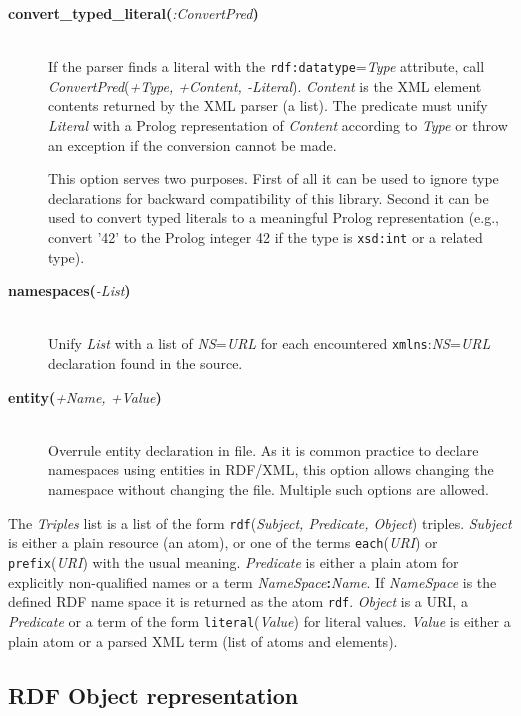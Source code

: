 \begin{description}
\begin{description}
  \item[{\bf convert\_typed\_literal}{\bf (}{\it :ConvertPred}{\bf)}]\mbox{}\\
If the parser finds a literal with the {\tt rdf:datatype}={\it Type}
attribute, call \emph{ConvertPred}({\it +Type, +Content, -Literal}).
{\it Content} is the XML element contents returned by the XML
parser (a list). The predicate must unify {\it Literal}
with a Prolog representation of {\it Content} according to
{\it Type} or throw an exception if the conversion cannot be made.

This option serves two purposes.  First of all it can be used
to ignore type declarations for backward compatibility of this
library.  Second it can be used to convert typed literals to 
a meaningful Prolog representation (e.g., convert '42' to the
Prolog integer 42 if the type is {\tt xsd:int} or a related
type).

  \item[{\bf namespaces}{\bf (}{\it -List}{\bf)}]\mbox{}\\
Unify {\it List} with a list of {\it NS}={\it URL} for each
encountered {\tt xmlns}:{\it NS}={\it URL} declaration found
in the source.

  \item[{\bf entity}{\bf (}{\it +Name, +Value}{\bf)}]\mbox{}\\
Overrule entity declaration in file.  As it is common practice
to declare namespaces using entities in RDF/XML, this option
allows changing the namespace without changing the file.
Multiple such options are allowed.
   \end{description}

The {\it Triples} list is a list of the form \texttt{rdf}({\it Subject, Predicate,
Object}) triples.  {\it Subject} is either a plain resource (an atom),
or one of the terms \texttt{each}({\it URI}) or \texttt{prefix}({\it URI}) with the
usual meaning.  {\it Predicate} is either a plain atom for
explicitly non-qualified names or a term 
\mbox{{\it NameSpace}{\bf :}{\it Name}}.  If {\it NameSpace} is the
defined RDF name space it is returned as the atom {\tt rdf}.
{\it Object} is a URI, a {\it Predicate} or a term of the
form \texttt{literal}({\it Value}) for literal values.  {\it Value} is
either a plain atom or a parsed XML term (list of atoms and elements).

\end{description}


\subsection{RDF Object representation}		\label{sec:rdfobject}

